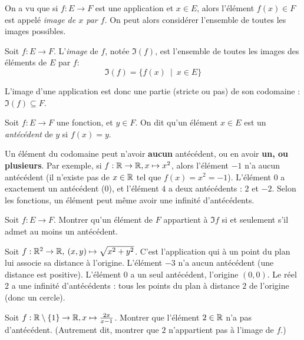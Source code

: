 On a vu que si $f : E\to F$ est une application et $x\in E$, alors l'élément $f(x)\in F$ est appelé \emph{image de $x$ par $f$}. On peut alors considérer l'ensemble de toutes les images possibles.

\begin{definition}
Soit $f : E\to F$. L'\emph{image} de $f$, notée $\Im(f)$, est l'ensemble de toutes les images des éléments de $E$ par $f$:
\[
\Im(f) = \{f(x)\:\mid\: x\in E\}
\]
\end{definition}

L'image d'une application est donc une partie (stricte ou pas) de son codomaine : $\Im(f)\subseteq F$.

\begin{definition}
Soit $f : E\to F$ une fonction, et $y\in F$. On dit qu'un élément $x\in E$ est un \emph{antécédent} de $y$ si $f(x)=y$.
\end{definition}

\begin{attention}
Un élément du codomaine peut n'avoir \textbf{aucun} antécédent, ou en avoir \textbf{un, ou plusieurs}. Par exemple, si $f : \mathbb{R}\to \mathbb{R}, x\mapsto x^2$, alors l'élément $-1$ n'a aucun antécédent (il n'existe pas de $x\in \mathbb{R}$ tel que $f(x)=x^2=-1$). L'élément $0$ a exactement un antécédent ($0$), et l'élément $4$ a deux antécédents : $2$ et $-2$. Selon les fonctions, un élément peut même avoir une infinité d'antécédents.
\end{attention}

\begin{exercice}
Soit $f : E\to F$. Montrer qu'un élément de $F$ appartient à $\Im f$ si et seulement s'il admet au moins un antécédent.
\end{exercice}

\begin{exemple}
Soit $f : \mathbb{R}^2\to \mathbb{R},\: (x,y)\mapsto \sqrt{x^2+y^2}$. C'est l'application qui à un point du plan lui associe sa distance à l'origine. L'élément $-3$ n'a aucun antécédent (une distance est positive). L'élément $0$ a un seul antécédent, l'origine $(0,0)$. Le réel $2$ a une infinité d'antécédents : tous les points du plan à distance $2$ de l'origine (donc un cercle).
\end{exemple}

\begin{exercice}
Soit $f : \mathbb{R}\setminus \{1\} \to \mathbb{R}, x\mapsto \frac{2x}{x-1}$. Montrer que l'élément $2 \in \mathbb{R}$ n'a pas d'antécédent. (Autrement dit, montrer que $2$ n'appartient pas à l'image de $f$.)
\end{exercice}


